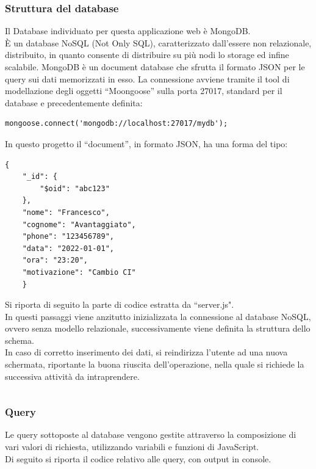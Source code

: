 \begin{flushleft}
\subsubsection{Struttura del database}
Il Database individuato per questa applicazione web è MongoDB. \\
È un database NoSQL (Not Only SQL), caratterizzato dall’essere non relazionale, distribuito, in quanto consente di distribuire su più nodi lo storage ed infine scalabile.
MongoDB è un document database che sfrutta il formato JSON per le query sui dati memorizzati in esso.
La connessione avviene tramite il tool di modellazione degli oggetti “Moongoose” sulla porta 27017, standard per il database e precedentemente definita:

\begin{lstlisting}
mongoose.connect('mongodb://localhost:27017/mydb');
\end{lstlisting}
\vspace{0.4 em}
\newpage
In questo progetto il “document”, in formato JSON, ha una forma del tipo:

\begin{lstlisting}
{
    "_id": {
        "$oid": "abc123"
    },
    "nome": "Francesco",
    "cognome": "Avantaggiato",
    "phone": "123456789",
    "data": "2022-01-01",
    "ora": "23:20",
    "motivazione": "Cambio CI"
	}

\end{lstlisting}
\vspace{0.6em}
Si riporta di seguito la parte di codice estratta da “server.js".\\
In questi passaggi viene anzitutto inizializzata la connessione al database NoSQL, ovvero senza modello relazionale, successivamente viene definita la struttura dello schema.\\
In caso di corretto inserimento dei dati, si reindirizza l'utente ad una nuova schermata, riportante la buona riuscita dell'operazione, nella quale si richiede la successiva attività da intraprendere.\\


\begin{lstlisting}
\end{lstlisting}

\subsubsection{Query}
Le query sottoposte al database vengono gestite attraverso la composizione di vari valori di richiesta, utilizzando variabili e funzioni di JavaScript.\\
Di seguito si riporta il codice relativo alle query, con output in console.



\end{flushleft}
